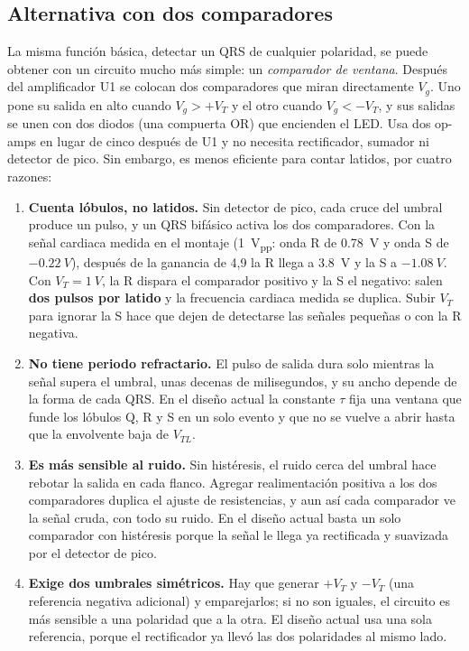 \documentclass[11pt,letterpaper]{article}
\newcommand{\Vg}{V_g}
\newcommand{\VTL}{V_{TL}}
\begin{document}
\subsection{Alternativa con dos comparadores}\label{sec:doscomp}

La misma función básica, detectar un QRS de cualquier polaridad, se puede obtener con un circuito mucho más simple: un \emph{comparador de ventana}. Después del amplificador U1 se colocan dos comparadores que miran directamente $\Vg$. Uno pone su salida en alto cuando $\Vg>+V_T$ y el otro cuando $\Vg<-V_T$, y sus salidas se unen con dos diodos (una compuerta OR) que encienden el LED. Usa dos op-amps en lugar de cinco después de U1 y no necesita rectificador, sumador ni detector de pico. Sin embargo, es menos eficiente para contar latidos, por cuatro razones:

\begin{enumerate}
  \item \textbf{Cuenta lóbulos, no latidos.} Sin detector de pico, cada cruce del umbral produce un pulso, y un QRS bifásico activa los dos comparadores. Con la señal cardiaca medida en el montaje (\SI{1}{V_{pp}}: onda R de \SI{0,78}{V} y onda S de $-\SI{0,22}{V}$), después de la ganancia de 4,9 la R llega a \SI{3,8}{V} y la S a $-\SI{1,08}{V}$. Con $V_T=\SI{1}{V}$, la R dispara el comparador positivo y la S el negativo: salen \textbf{dos pulsos por latido} y la frecuencia cardiaca medida se duplica. Subir $V_T$ para ignorar la S hace que dejen de detectarse las señales pequeñas o con la R negativa.
  \item \textbf{No tiene periodo refractario.} El pulso de salida dura solo mientras la señal supera el umbral, unas decenas de milisegundos, y su ancho depende de la forma de cada QRS. En el diseño actual la constante $\tau$ fija una ventana que funde los lóbulos Q, R y S en un solo evento y que no se vuelve a abrir hasta que la envolvente baja de $\VTL$.
  \item \textbf{Es más sensible al ruido.} Sin histéresis, el ruido cerca del umbral hace rebotar la salida en cada flanco. Agregar realimentación positiva a los dos comparadores duplica el ajuste de resistencias, y aun así cada comparador ve la señal cruda, con todo su ruido. En el diseño actual basta un solo comparador con histéresis porque la señal le llega ya rectificada y suavizada por el detector de pico.
  \item \textbf{Exige dos umbrales simétricos.} Hay que generar $+V_T$ y $-V_T$ (una referencia negativa adicional) y emparejarlos; si no son iguales, el circuito es más sensible a una polaridad que a la otra. El diseño actual usa una sola referencia, porque el rectificador ya llevó las dos polaridades al mismo lado.
\end{enumerate}
\end{document}
